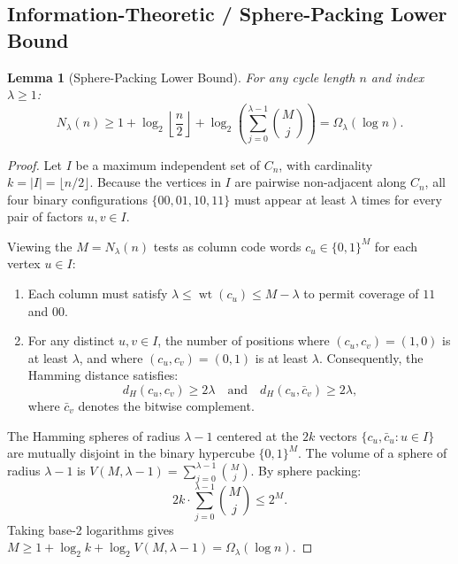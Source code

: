 \documentclass[11pt,a4paper]{article}
\newtheorem{lemma}[theorem]{Lemma}
\theoremstyle{definition}
\theoremstyle{remark}
\begin{document}
\subsection{Information-Theoretic / Sphere-Packing Lower Bound}

\begin{lemma}[Sphere-Packing Lower Bound]
\label{lem:sphere_packing}
For any cycle length $n$ and index $\lambda \ge 1$:
\begin{equation}
    N_\lambda(n) \ge 1 + \log_2\left\lfloor \frac{n}{2} \right\rfloor + \log_2\left( \sum_{j=0}^{\lambda-1} \binom{M}{j} \right) = \Omega_\lambda(\log n).
\end{equation}
\end{lemma}

\begin{proof}
Let $I$ be a maximum independent set of $C_n$, with cardinality $k = |I| = \lfloor n/2 \rfloor$.
Because the vertices in $I$ are pairwise non-adjacent along $C_n$, all four binary configurations $\{00, 01, 10, 11\}$ must appear at least $\lambda$ times for every pair of factors $u, v \in I$.

Viewing the $M = N_\lambda(n)$ tests as column code words $c_u \in \{0, 1\}^M$ for each vertex $u \in I$:
\begin{enumerate}
    \item Each column must satisfy $\lambda \le \operatorname{wt}(c_u) \le M - \lambda$ to permit coverage of $11$ and $00$.
    \item For any distinct $u, v \in I$, the number of positions where $(c_u, c_v) = (1, 0)$ is at least $\lambda$, and where $(c_u, c_v) = (0, 1)$ is at least $\lambda$. Consequently, the Hamming distance satisfies:
    \begin{equation}
        d_H(c_u, c_v) \ge 2\lambda \quad \text{and} \quad d_H(c_u, \bar{c}_v) \ge 2\lambda,
    \end{equation}
    where $\bar{c}_v$ denotes the bitwise complement.
\end{enumerate}
The Hamming spheres of radius $\lambda - 1$ centered at the $2k$ vectors $\{c_u, \bar{c}_u : u \in I\}$ are mutually disjoint in the binary hypercube $\{0, 1\}^M$.
The volume of a sphere of radius $\lambda - 1$ is $V(M, \lambda - 1) = \sum_{j=0}^{\lambda - 1} \binom{M}{j}$.
By sphere packing:
\begin{equation}
    2k \cdot \sum_{j=0}^{\lambda - 1} \binom{M}{j} \le 2^M.
\end{equation}
Taking base-2 logarithms gives $M \ge 1 + \log_2 k + \log_2 V(M, \lambda - 1) = \Omega_\lambda(\log n)$.
\end{proof}
\end{document}
